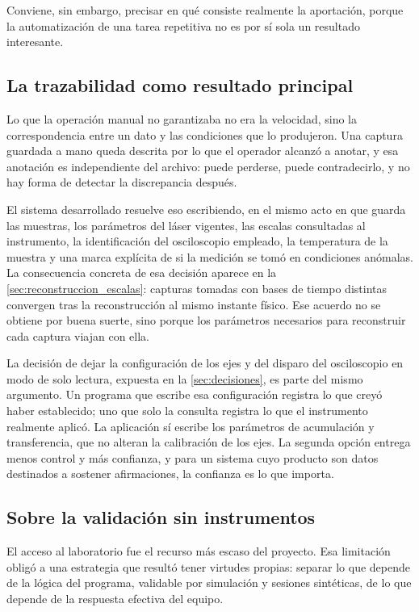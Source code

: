 Conviene, sin embargo, precisar en qué consiste realmente la
aportación, porque la automatización de una tarea repetitiva no es por
sí sola un resultado interesante.

\subsection*{La trazabilidad como resultado principal}

Lo que la operación manual no garantizaba no era la velocidad, sino la
correspondencia entre un dato y las condiciones que lo produjeron. Una
captura guardada a mano queda descrita por lo que el operador alcanzó a
anotar, y esa anotación es independiente del archivo: puede perderse,
puede contradecirlo, y no hay forma de detectar la discrepancia después.

El sistema desarrollado resuelve eso escribiendo, en el mismo acto en
que guarda las muestras, los parámetros del láser vigentes, las escalas
consultadas al instrumento, la identificación del osciloscopio empleado,
la temperatura de la muestra y una marca explícita de si la medición se
tomó en condiciones anómalas. La consecuencia concreta de esa
decisión aparece en la \cref{sec:reconstruccion_escalas}: capturas
tomadas con bases de tiempo distintas convergen tras la reconstrucción
al mismo instante físico. Ese acuerdo no se obtiene por buena suerte,
sino porque los parámetros necesarios para reconstruir cada captura
viajan con ella.

La decisión de dejar la configuración de los ejes y del disparo del
osciloscopio en modo de solo lectura, expuesta en la
\cref{sec:decisiones}, es parte del mismo argumento. Un programa que
escribe esa configuración registra lo que creyó haber establecido; uno
que solo la consulta registra lo que el instrumento realmente aplicó.
La aplicación sí escribe los parámetros de acumulación y transferencia,
que no alteran la calibración de los ejes. La segunda opción entrega
menos control y más confianza, y para un sistema cuyo producto son datos
destinados a sostener afirmaciones, la confianza es lo que importa.

\subsection*{Sobre la validación sin instrumentos}

El acceso al laboratorio fue el recurso más escaso del proyecto. Esa
limitación obligó a una estrategia que resultó tener virtudes propias:
separar lo que depende de la lógica del programa, validable por
simulación y sesiones sintéticas, de lo que depende de la respuesta
efectiva del equipo.

